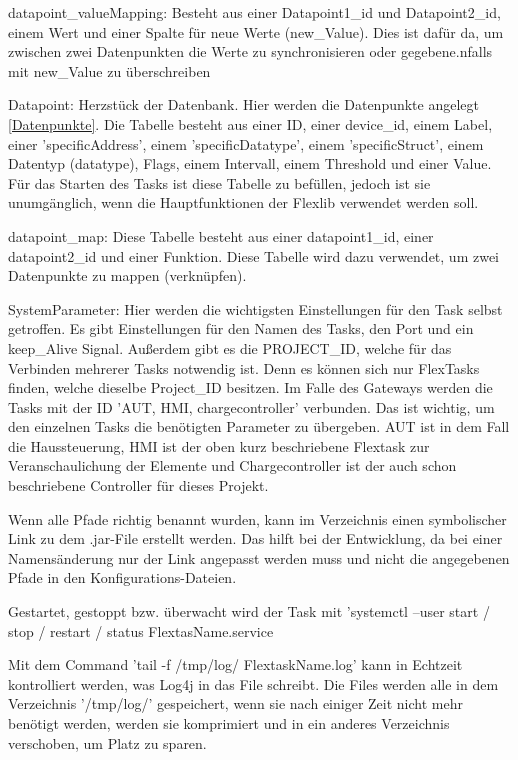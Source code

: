\begin{compactenum}
\begin{compactenum}
        \item datapoint\_valueMapping: Besteht aus einer Datapoint1\_id und Datapoint2\_id, einem Wert und einer Spalte für neue Werte (new\_Value). Dies ist dafür da, um zwischen zwei Datenpunkten die Werte zu synchronisieren oder gegebene.nfalls mit new\_Value zu überschreiben
        \item Datapoint: Herzstück der Datenbank. Hier werden die Datenpunkte angelegt \ref{Datenpunkte}. Die Tabelle besteht aus einer ID, einer device\_id, einem Label, einer 'specificAddress', einem 'specificDatatype', einem 'specificStruct', einem Datentyp (datatype), Flags, einem Intervall, einem Threshold und einer Value. Für das Starten des Tasks ist diese Tabelle zu befüllen, jedoch ist sie unumgänglich, wenn die Hauptfunktionen der Flexlib verwendet werden soll.
        \item datapoint\_map: Diese Tabelle besteht aus einer datapoint1\_id, einer datapoint2\_id und einer Funktion. Diese Tabelle wird dazu verwendet, um zwei Datenpunkte zu mappen (verknüpfen).
        \item SystemParameter: Hier werden die wichtigsten Einstellungen für den Task selbst getroffen. Es gibt Einstellungen für den Namen des Tasks, den Port und ein keep\_Alive Signal. Außerdem gibt es die PROJECT\_ID, welche für das Verbinden mehrerer Tasks notwendig ist. Denn es können sich nur FlexTasks finden, welche dieselbe Project\_ID besitzen. Im Falle des Gateways werden die Tasks mit der ID 'AUT, HMI, chargecontroller' verbunden. Das ist wichtig, um den einzelnen Tasks die benötigten Parameter zu übergeben. AUT ist in dem Fall die Haussteuerung, HMI ist der oben kurz beschriebene Flextask zur Veranschaulichung der Elemente und Chargecontroller ist der auch schon beschriebene Controller für dieses Projekt.
    \end{compactenum}
    \item Wenn alle Pfade richtig benannt wurden, kann im Verzeichnis einen symbolischer Link zu dem .jar-File erstellt werden. Das hilft bei der Entwicklung, da bei einer Namensänderung nur der Link angepasst werden muss und nicht die angegebenen Pfade in den Konfigurations-Dateien.
    \item Gestartet, gestoppt bzw. überwacht wird der Task mit 'systemctl --user start / stop / restart / status FlextasName.service
    \item Mit dem Command 'tail -f /tmp/log/ FlextaskName.log' kann in Echtzeit kontrolliert werden, was Log4j in das File schreibt. Die Files werden alle in dem Verzeichnis '/tmp/log/' gespeichert, wenn sie nach einiger Zeit nicht mehr benötigt werden, werden sie komprimiert und in ein anderes Verzeichnis verschoben, um Platz zu sparen.
\end{compactenum}
